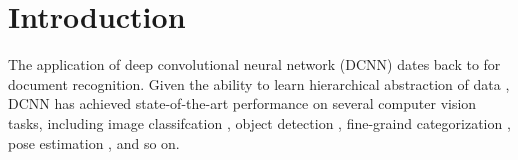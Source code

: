 \section{Introduction}
The application of deep convolutional neural network (DCNN) dates back to \citet{LeCun1998} for document recognition. Given the ability to learn hierarchical abstraction of data \citep{zeiler2014visualizing}, DCNN has achieved state-of-the-art performance on several computer vision tasks, including image classifcation \citet{KrizhevskyNIPS2013, papandreou2014untangling, sermanet2013overfeat, simonyan2014very, szegedy2014going}, object detection \citet{girshick2014rcnn}, fine-graind categorization \citet{zhang2014part}, pose estimation \citet{chen2014articulated, tompson2014joint}, and so on. 
